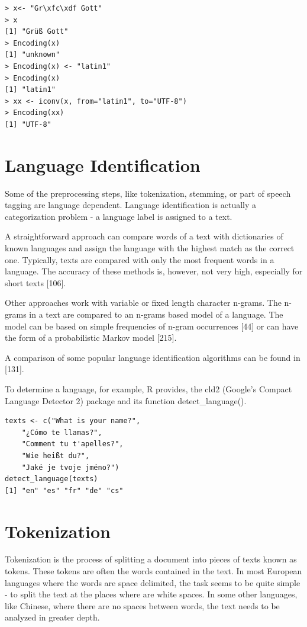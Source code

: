 \documentclass[11pt,openany,executivepaper]{book}
\begin{document}
\begin{verbatim}
> x<- "Gr\xfc\xdf Gott"
> x
[1] "Grüß Gott"
> Encoding(x)
[1] "unknown"
> Encoding(x) <- "latin1"
> Encoding(x)
[1] "latin1"
> xx <- iconv(x, from="latin1", to="UTF-8")
> Encoding(xx)
[1] "UTF-8"
\end{verbatim}

\section{Language Identification}
Some of the preprocessing steps, like tokenization, stemming, or part of speech tagging are language dependent. Language identification is actually a categorization problem - a language label is assigned to a text.

A straightforward approach can compare words of a text with dictionaries of known languages and assign the language with the highest match as the correct one. Typically, texts are compared with only the most frequent words in a language. The accuracy of these methods is, however, not very high, especially for short texts [106].

Other approaches work with variable or fixed length character n-grams. The n-grams in a text are compared to an n-grams based model of a language. The model can be based on simple frequencies of n-gram occurrences [44] or can have the form of a probabilistic Markov model [215].

A comparison of some popular language identification algorithms can be found in [131].

To determine a language, for example, R provides, the cld2 (Google's Compact Language Detector 2) package and its function detect\_language().

\begin{verbatim}
texts <- c("What is your name?",
    "¿Cómo te llamas?",
    "Comment tu t'apelles?",
    "Wie heißt du?",
    "Jaké je tvoje jméno?")
detect_language(texts)
[1] "en" "es" "fr" "de" "cs"
\end{verbatim}

\section{Tokenization}
Tokenization is the process of splitting a document into pieces of texts known as tokens. These tokens are often the words contained in the text. In most European languages where the words are space delimited, the task seems to be quite simple - to split the text at the places where are white spaces. In some other languages, like Chinese, where there are no spaces between words, the text needs to be analyzed in greater depth.
\end{document}

